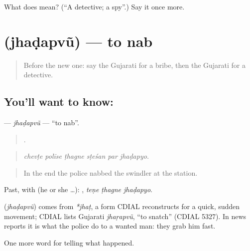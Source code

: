 \begin{tcolorbox}[breakable,colback=teal!4,colframe=teal!35!black,title={Before you move on}]
What does  mean? (\textquotedblleft{}A detective; a spy\textquotedblright{}.) Say it once more.
\end{tcolorbox}
\section[\texorpdfstring{\gu{ઝડપવું} (jhaḍapvũ)}{ઝડપવું (jhaḍapvũ)}]{ (jhaḍapvũ) — to nab}

\label{lesson:GU-C292-jhadapvu}



\begin{quote}
Before the new one: say the Gujarati for a bribe, then the Gujarati for a detective.
\end{quote}

\subsection*{You'll want to know: }
\textbf{} — \emph{jhaḍapvũ} — \textquotedblleft{}to nab\textquotedblright{}.

\begin{quote}
     .
\end{quote}

\begin{quote}
\emph{chevṭe polīse ṭhagne sṭeśan par jhaḍapyo.}
\end{quote}

\begin{quote}
In the end the police nabbed the swindler at the station.
\end{quote}

Past, with  (he or she …):   , \emph{teṇe ṭhagne jhaḍapyo}.

\begin{cousinweb}
\textbf{} (\emph{jhaḍapvũ}) comes from \emph{*jhaṭ}, a form CDIAL reconstructs for a quick, sudden movement; CDIAL lists Gujarati \emph{jhaṛapvũ}, \textquotedblleft{}to snatch\textquotedblright{} (CDIAL 5327). In news reports it is what the police do to a wanted man: they grab him fast.
\end{cousinweb}

\begin{grammarlens}[title={What you've built}]
One more word for telling what happened.
\end{grammarlens}


